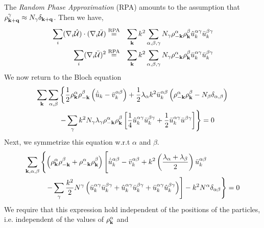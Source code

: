 \documentclass{article}
\begin{document}
The {\em Random Phase Approximation} (RPA) amounts to the assumption
that $\rho^\gamma_{\mathbf{k} + \mathbf{q}} \approx N_\gamma \delta_{\mathbf{k} + \mathbf{q}}$. 
Then we have,
\begin{eqnarray}
\sum_i (\nabla_i \hat{\mathcal{U}}) \cdot ( \nabla_i \bar{\mathcal{U}}
) & \overset{\text{RPA}}{=} &
\sum_{\mathbf{k}} k^2 \sum_{\alpha, \beta, \gamma} N_\gamma \rho^\alpha_{-\mathbf{k}}
\rho^\beta_{\mathbf{k}} \hat{u}^{\alpha \gamma}_k \bar{u}^{\beta \gamma}_k \\
\sum_i (\nabla_i \bar{\mathcal{U}})^2 & \overset{\text{RPA}}{=} &
\sum_{\mathbf{k}} k^2 \sum_{\alpha, \beta, \gamma} N_\gamma
\rho^{\alpha}_{-\mathbf{k}} \rho^\beta_{\mathbf{k}} \bar{u}_k^{\alpha \gamma}
\bar{u}_k^{\beta \gamma}
\end{eqnarray}
We now return to the Bloch equation
\begin{equation}
\begin{split}
\sum_{\mathbf{k}} \sum_{\alpha,\beta} & \left\{ 
\frac{1}{2} \rho_{\mathbf{k}}^\alpha
\rho_{-\mathbf{k}}^\beta \left(\dot{\bar{u}}_k - \bar{v}_k^{\alpha \beta} \right)
+\frac{1}{2} \lambda_\alpha k^2 \bar{u}_k^{\alpha \beta}
\left(\rho_{-\mathbf{k}}^\alpha 
  \rho_{\mathbf{k}}^\beta - N_\beta \delta_{\alpha,\beta} \right) 
\right. \\
& \left. -\sum_\gamma k^2 N_\gamma \lambda_\gamma \rho_{-\mathbf{k}}^\alpha
  \rho_{\mathbf{k}}^\beta \left[ 
\frac{1}{4} \hat{u}^{\alpha \gamma}_k \bar{u}^{\beta\gamma}_k +
\frac{1}{2} \bar{u}^{\alpha \gamma}_k \bar{u}^{\beta \gamma}
\right]\right\} = 0
\end{split}
\end{equation}
Next, we symmetrize this equation w.r.t $\alpha$ and $\beta$.
\begin{equation}
\begin{split}
\sum_{\vk, \alpha, \beta} & \left\{ \left( \rho^\alpha_{\vk} \rho^\beta_{-\vk} 
+ \rho^\alpha_{-\vk} \rho^\beta_{\vk} \right) \left[
\dot{\bar{u}}_k^{\alpha \beta} - \bar{v}_k^{\alpha \beta}
 +k^2 \left(\frac{\lambda_\alpha+\lambda_\beta}{2}\right) 
\bar{u}_k^{\alpha \beta} \rule{0cm}{0.6cm} \right.\right. \\
& \ \ \left.\left.-\sum_\gamma \frac{k^2}{2} N^\gamma \left(
\bar{u}_k^{\alpha \gamma} \bar{u}_k^{\beta \gamma} +
\hat{u}_k^{\alpha \gamma} \bar{u}_k^{\beta \gamma} +
\bar{u}_k^{\alpha \gamma} \hat{u}_k^{\beta \gamma}  \right)
\right]
- k^2 N^\alpha \delta_{\alpha \beta}
\right\} = 0
\end{split}
\end{equation}
We require that this expression hold independent of the positions of
the particles, i.e. independent of the values of $\rho^\alpha_{\mathbf{k}}$ and
\end{document}
